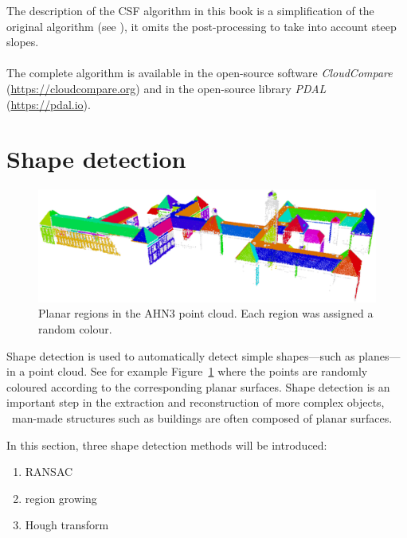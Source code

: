 \begin{floatbox}
  \begin{kaobox-practice}[frametitle=\faCog\ CSF is implemented in several open-source libraries]
  The description of the CSF algorithm in this book is a simplification of the original algorithm (see \citet{Zhang16}), it omits the post-processing to take into account steep slopes.
  \\ \\
  The complete algorithm is available in the open-source software \emph{CloudCompare} (\url{https://cloudcompare.org}) and in the open-source library \emph{PDAL} (\url{https://pdal.io}).
  \end{kaobox-practice}
\end{floatbox}


%
\section{Shape detection}%
\label{sec:shape-detection}%

\begin{figure}
	\centering
	\includegraphics[width=\linewidth]{bk-planes.png}
	\caption{Planar regions in the AHN3 point cloud. Each region was assigned a random colour.}%
\label{fig:bk-planes}
\end{figure}

Shape detection is used to automatically detect simple shapes---such as planes---in a point cloud.
See for example Figure~\ref{fig:bk-planes} where the points are randomly coloured according to the corresponding planar surfaces.
Shape detection is an important step in the extraction and reconstruction of more complex objects, \eg\ man-made structures such as buildings are often composed of planar surfaces.

In this section, three shape detection methods will be introduced: 
\begin{enumerate}
  \item RANSAC 
  \item region growing 
  \item Hough transform
\end{enumerate}


